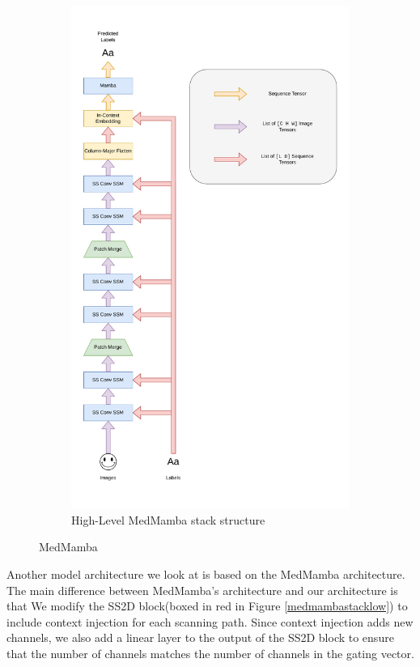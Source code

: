 \begin{figure}[ht]
\begin{subfigure}{0.5\textwidth}
        \includegraphics[width=\textwidth]{figures/medmamba_stack.pdf}
        \caption{High-Level MedMamba stack structure}
        \label{medmambastackhigh}
    \end{subfigure}
    \caption{MedMamba}
    \label{medmambastack}
\end{figure}
Another model architecture we look at is based on the MedMamba
architecture\cite{medmamba}.
The main difference between MedMamba's architecture and our architecture is that
We modify the SS2D block(boxed in red in Figure \ref{medmambastacklow}) to include context injection for each scanning
path.
Since context injection adds new channels, we also add a linear layer to the
output of the SS2D block to ensure that the number of channels matches the
number of channels in the gating vector.

